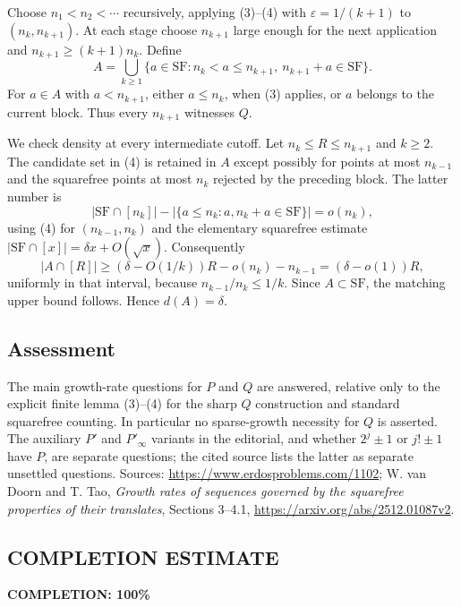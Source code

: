 Choose $n_1<n_2<\cdots$ recursively, applying (3)--(4) with $\varepsilon=1/(k+1)$ to $(n_k,n_{k+1})$. At each stage choose $n_{k+1}$ large enough for the next application and $n_{k+1}\ge(k+1)n_k$. Define
\[
 A=\bigcup_{k\ge1}\{a\in\mathrm{SF}:n_k<a\le n_{k+1},\
                                      n_{k+1}+a\in\mathrm{SF}\}.
\]
For $a\in A$ with $a<n_{k+1}$, either $a\le n_k$, when (3) applies, or $a$ belongs to the current block. Thus every $n_{k+1}$ witnesses $Q$.

We check density at every intermediate cutoff. Let $n_k\le R\le n_{k+1}$ and $k\ge2$. The candidate set in (4) is retained in $A$ except possibly for points at most $n_{k-1}$ and the squarefree points at most $n_k$ rejected by the preceding block. The latter number is
\[
 |\mathrm{SF}\cap[n_k]|-
 |\{a\le n_k:a,n_k+a\in\mathrm{SF}\}|=o(n_k),
\]
using (4) for $(n_{k-1},n_k)$ and the elementary squarefree estimate
$|\mathrm{SF}\cap[x]|=\delta x+O(\sqrt x)$.
Consequently
\[
 |A\cap[R]|\ge(\delta-O(1/k))R-o(n_k)-n_{k-1}
             =(\delta-o(1))R,
\]
uniformly in that interval, because $n_{k-1}/n_k\le1/k$. Since $A\subset\mathrm{SF}$, the matching upper bound follows. Hence $d(A)=\delta$.

\subsection*{Assessment}
The main growth-rate questions for $P$ and $Q$ are answered, relative only to the explicit finite lemma (3)--(4) for the sharp $Q$ construction and standard squarefree counting. In particular no sparse-growth necessity for $Q$ is asserted. The auxiliary $P'$ and $P'_\infty$ variants in the editorial, and whether $2^j\pm1$ or $j!\pm1$ have $P$, are separate questions; the cited source lists the latter as separate unsettled questions.
Sources: \url{https://www.erdosproblems.com/1102}; W. van Doorn and T. Tao, \emph{Growth rates of sequences governed by the squarefree properties of their translates}, Sections 3--4.1, \url{https://arxiv.org/abs/2512.01087v2}.
\subsection*{COMPLETION ESTIMATE}
\textbf{COMPLETION: 100\%}
